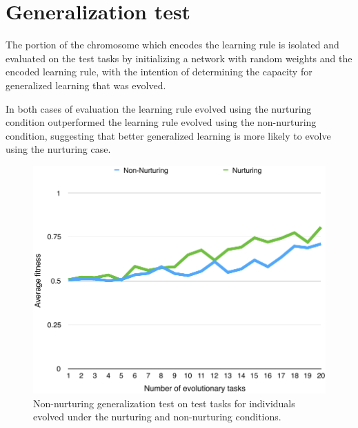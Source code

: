 \documentclass[master]{outhesis}
\begin{document}
\section{Generalization test}

The portion of the chromosome which encodes the learning rule is isolated and evaluated on the test tasks by initializing a network with random weights and the encoded learning rule, with the intention of determining the capacity for generalized learning that was evolved.

In both cases of evaluation the learning rule evolved using the nurturing condition outperformed the learning rule evolved using the non-nurturing condition, suggesting that better generalized learning is more likely to evolve using the nurturing case.

\begin{figure}[H]
	\centering
	\includegraphics{NonNurturingGeneralizationTestPlot.pdf}
	\caption{Non-nurturing generalization test on test tasks for individuals evolved under the nurturing and non-nurturing conditions.}
\end{figure}
\end{document}
